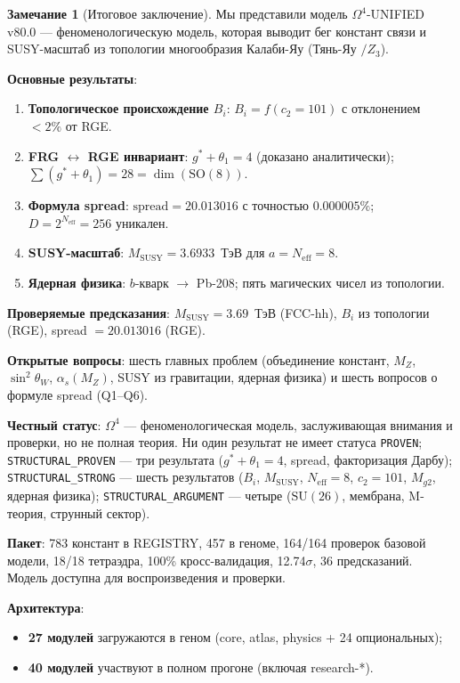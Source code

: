 \documentclass[11pt,a4paper]{article}
\newcommand{\SU}{\ensuremath{\mathrm{SU}}}
\newcommand{\SO}{\ensuremath{\mathrm{SO}}}
\newcommand{\Om}{\ensuremath{\Omega^4}}
\theoremstyle{definition}
\newtheorem{remark}[theorem]{Замечание}
\begin{document}
\begin{remark}[Итоговое заключение]
\label{rem:conclusions-final-statement}
Мы представили модель $\Om$-UNIFIED v80.0 ---
феноменологическую модель, которая выводит бег констант связи
и SUSY-масштаб из топологии многообразия Калаби-Яу
(Тянь-Яу $/Z_3$).

\medskip\noindent
\textbf{Основные результаты}:
\begin{enumerate}
    \item \textbf{Топологическое происхождение $B_i$}:
          $B_i = f(c_2 = 101)$ с отклонением $< 2\%$ от RGE.
    \item \textbf{FRG $\leftrightarrow$ RGE инвариант}:
          $g^* + \theta_1 = 4$ (доказано аналитически);
          $\sum(g^* + \theta_1) = 28 = \dim(\SO(8))$.
    \item \textbf{Формула spread}:
          $\text{spread} = 20.013016$ с точностью $0.000005\%$;
          $D = 2^{N_{\text{eff}}} = 256$ уникален.
    \item \textbf{SUSY-масштаб}:
          $M_{\text{SUSY}} = 3.6933$~ТэВ для $a = N_{\text{eff}} = 8$.
    \item \textbf{Ядерная физика}:
          $b$-кварк $\to$ Pb-208; пять магических чисел
          из топологии.
\end{enumerate}

\medskip\noindent
\textbf{Проверяемые предсказания}:
$M_{\text{SUSY}} = 3.69$~ТэВ (FCC-hh),
$B_i$ из топологии (RGE),
spread $= 20.013016$ (RGE).

\medskip\noindent
\textbf{Открытые вопросы}:
шесть главных проблем (объединение констант, $M_Z$,
$\sin^2\theta_W$, $\alpha_s(M_Z)$, SUSY из гравитации,
ядерная физика)
и шесть вопросов о формуле spread (Q1--Q6).

\medskip\noindent
\textbf{Честный статус}:
$\Om$ --- феноменологическая модель, заслуживающая
внимания и проверки, но не полная теория.
Ни один результат не имеет статуса \texttt{PROVEN};
\texttt{STRUCTURAL\_PROVEN} --- три результата
($g^* + \theta_1 = 4$, spread, факторизация Дарбу);
\texttt{STRUCTURAL\_STRONG} --- шесть результатов
($B_i$, $M_{\text{SUSY}}$, $N_{\text{eff}} = 8$, $c_2 = 101$,
$M_{g2}$, ядерная физика); \texttt{STRUCTURAL\_ARGUMENT} --- четыре
($\SU(26)$, мембрана, M-теория, струнный сектор).

\medskip\noindent
\textbf{Пакет}: 783 констант в REGISTRY, 457 в геноме,
164/164 проверок базовой модели, 18/18 тетраэдра,
100\% кросс-валидация, 12.74$\sigma$, 36 предсказаний.
Модель доступна для воспроизведения и проверки.

\medskip\noindent
\textbf{Архитектура}:
\begin{itemize}
    \item \textbf{27 модулей} загружаются в геном
          (core, atlas, physics + 24 опциональных);
    \item \textbf{40 модулей} участвуют в полном прогоне
          (включая research-*).
\end{itemize}
\end{remark}
\end{document}
